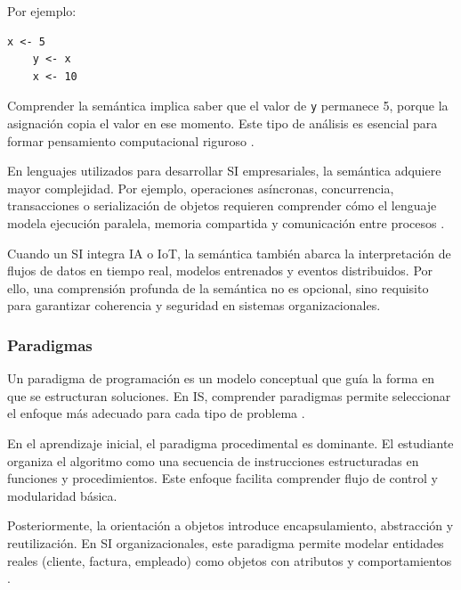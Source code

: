 \documentclass[12pt,twoside]{book}
\begin{document}
						Por ejemplo:
						
						\begin{lstlisting}[style=upsamStyle, caption={Ejemplo semántico básico.}, label={lst:SemanticaEjemplo}, basicstyle=\small\ttfamily]
	x <- 5
	y <- x
	x <- 10 \end{lstlisting}
						
						Comprender la semántica implica saber que el valor de \texttt{y} permanece 5, porque la asignación copia el valor en ese momento. Este tipo de análisis es esencial para formar pensamiento computacional riguroso \cite{Wing2006Computational}.
						
						En lenguajes utilizados para desarrollar SI empresariales, la semántica adquiere mayor complejidad. Por ejemplo, operaciones asíncronas, concurrencia, transacciones o serialización de objetos requieren comprender cómo el lenguaje modela ejecución paralela, memoria compartida y comunicación entre procesos \cite{Tanenbaum2021Structured,Silberschatz2018Operating}. 
						
						Cuando un SI integra IA o IoT, la semántica también abarca la interpretación de flujos de datos en tiempo real, modelos entrenados y eventos distribuidos. Por ello, una comprensión profunda de la semántica no es opcional, sino requisito para garantizar coherencia y seguridad en sistemas organizacionales.
					
					\subsubsection{Paradigmas}
						\noindent
						Un paradigma de programación es un modelo conceptual que guía la forma en que se estructuran soluciones. En IS, comprender paradigmas permite seleccionar el enfoque más adecuado para cada tipo de problema \cite{Sebesta2018Concepts,SWEBOK2025Guide}.
						
						En el aprendizaje inicial, el paradigma procedimental es dominante. El estudiante organiza el algoritmo como una secuencia de instrucciones estructuradas en funciones y procedimientos. Este enfoque facilita comprender flujo de control y modularidad básica.
						
						Posteriormente, la orientación a objetos introduce encapsulamiento, abstracción y reutilización. En SI organizacionales, este paradigma permite modelar entidades reales (cliente, factura, empleado) como objetos con atributos y comportamientos \cite{Sommerville2015Software}.
						
\end{document}
